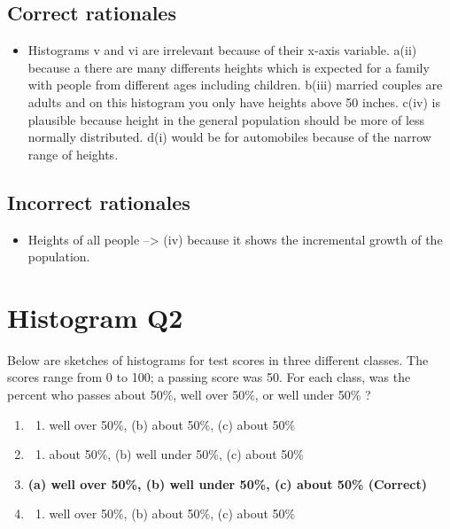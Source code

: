 \documentclass[letterpaper,10pt,twoside,printwatermark=false]{pinp}
\providecommand{\tightlist}{%
  \setlength{\itemsep}{0pt}\setlength{\parskip}{0pt}}
\begin{document}
\subsection{Correct rationales}\label{correct-rationales-2}

\begin{itemize}
\tightlist
\item
  Histograms v and vi are irrelevant because of their x-axis variable.
  a(ii) because a there are many differents heights which is expected
  for a family with people from different ages including children.
  b(iii) married couples are adults and on this histogram you only have
  heights above 50 inches. c(iv) is plausible because height in the
  general population should be more of less normally distributed. d(i)
  would be for automobiles because of the narrow range of heights.
\end{itemize}

\subsection{Incorrect rationales}\label{incorrect-rationales-2}

\begin{itemize}
\tightlist
\item
  Heights of all people --\textgreater{} (iv) because it shows the
  incremental growth of the population.
\end{itemize}

\section{Histogram Q2}\label{histogram-q2}

Below are sketches of histograms for test scores in three different
classes. The scores range from 0 to 100; a passing score was 50. For
each class, was the percent who passes about 50\%, well over 50\%, or
well under 50\% ?

\begin{enumerate}
\def\labelenumi{\alph{enumi})}
\item
  \begin{enumerate}
  \def\labelenumii{(\alph{enumii})}
  \tightlist
  \item
    well over 50\%, (b) about 50\%, (c) about 50\%
  \end{enumerate}
\item
  \begin{enumerate}
  \def\labelenumii{(\alph{enumii})}
  \tightlist
  \item
    about 50\%, (b) well under 50\%, (c) about 50\%
  \end{enumerate}
\item
  \textbf{(a) well over 50\%, (b) well under 50\%, (c) about 50\%
  (Correct)}
\item
  \begin{enumerate}
  \def\labelenumii{(\alph{enumii})}
  \tightlist
  \item
    well over 50\%, (b) about 50\%, (c) about 50\%
  \end{enumerate}
\end{enumerate}
\end{document}
